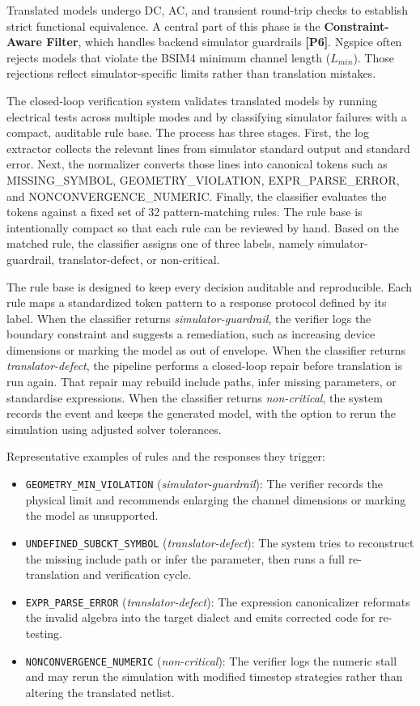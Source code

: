 \documentclass[conference]{IEEEtran}
\begin{document}
Translated models undergo DC, AC, and transient round-trip checks to establish strict functional equivalence. A central part of this phase is the \textbf{Constraint-Aware Filter}, which handles backend simulator guardrails \textbf{[P6]}. Ngspice often rejects models that violate the BSIM4 minimum channel length ($L_{min}$). Those rejections reflect simulator-specific limits rather than translation mistakes.

The closed-loop verification system validates translated models by running electrical tests across multiple modes and by classifying simulator failures with a compact, auditable rule base. The process has three stages. First, the log extractor collects the relevant lines from simulator standard output and standard error. Next, the normalizer converts those lines into canonical tokens such as MISSING\_SYMBOL, GEOMETRY\_VIOLATION, EXPR\_PARSE\_ERROR, and NONCONVERGENCE\_NUMERIC. Finally, the classifier evaluates the tokens against a fixed set of 32 pattern-matching rules. The rule base is intentionally compact so that each rule can be reviewed by hand. Based on the matched rule, the classifier assigns one of three labels, namely simulator-guardrail, translator-defect, or non-critical.

The rule base is designed to keep every decision auditable and reproducible. Each rule maps a standardized token pattern to a response protocol defined by its label. When the classifier returns \textit{simulator-guardrail}, the verifier logs the boundary constraint and suggests a remediation, such as increasing device dimensions or marking the model as out of envelope. When the classifier returns \textit{translator-defect}, the pipeline performs a closed-loop repair before translation is run again. That repair may rebuild include paths, infer missing parameters, or standardise expressions. When the classifier returns \textit{non-critical}, the system records the event and keeps the generated model, with the option to rerun the simulation using adjusted solver tolerances.

Representative examples of rules and the responses they trigger:
\begin{itemize}
    \item \texttt{GEOMETRY\_MIN\_VIOLATION} (\textit{simulator-guardrail}): The verifier records the physical limit and recommends enlarging the channel dimensions or marking the model as unsupported.
    \item \texttt{UNDEFINED\_SUBCKT\_SYMBOL} (\textit{translator-defect}): The system tries to reconstruct the missing include path or infer the parameter, then runs a full re-translation and verification cycle.
    \item \texttt{EXPR\_PARSE\_ERROR} (\textit{translator-defect}): The expression canonicalizer reformats the invalid algebra into the target dialect and emits corrected code for re-testing.
    \item \texttt{NONCONVERGENCE\_NUMERIC} (\textit{non-critical}): The verifier logs the numeric stall and may rerun the simulation with modified timestep strategies rather than altering the translated netlist.
\end{itemize}
\end{document}
